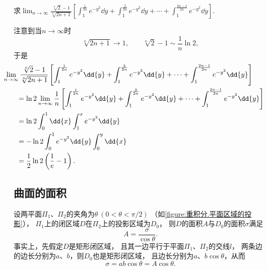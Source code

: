 \begin{example}
求\(\lim_{n\to\infty} \frac{\sqrt[n]{2}-1}{\sqrt[n]{2n+1}}
\left[
	\int_1^{\frac1{2n}} e^{-y^2} \dd{y}
	+ \int_1^{\frac3{2n}} e^{-y^2} \dd{y}
	+ \dotsb + \int_1^{\frac{2n-1}{2n}} e^{-y^2} \dd{y}
\right]\).
\begin{solution}
注意到当\(n\to\infty\)时\begin{equation*}
	\sqrt[n]{2n+1} \to 1,%
	\qquad
	\sqrt[n]{2}-1 \sim \frac1n \ln2,%
\end{equation*}
于是\begin{align*}
	&\hspace{-20pt}
	\lim_{n\to\infty} \frac{\sqrt[n]{2}-1}{\sqrt[n]{2n+1}}
	\left[
		\int_1^{\frac1{2n}} e^{-y^2} \dd{y}
		+ \int_1^{\frac3{2n}} e^{-y^2} \dd{y}
		+ \dotsb + \int_1^{\frac{2n-1}{2n}} e^{-y^2} \dd{y}
	\right] \\
	&= \ln2 \lim_{n\to\infty} \frac1n
	\left[
		\int_1^{\frac1{2n}} e^{-y^2} \dd{y}
		+ \int_1^{\frac3{2n}} e^{-y^2} \dd{y}
		+ \dotsb + \int_1^{\frac{2n-1}{2n}} e^{-y^2} \dd{y}
	\right] \\
	&= \ln2 \int_0^1 \dd{x} \int_1^x e^{-y^2} \dd{y} \\
	&= -\ln 2 \int_0^1 e^{-y^2} \dd{y} \int_0^y \dd{x} \\
	&= \frac12 \ln2 \left( \frac1e - 1 \right).
\end{align*}
\end{solution}
\end{example}

\subsection{曲面的面积}
设两平面\(\Pi_1\)、\(\Pi_2\)的夹角为\(\theta\ (0<\theta<\pi/2)\)
（如\cref{figure:重积分.平面区域的投影}），
\(\Pi_1\)上的闭区域\(D\)在\(\Pi_2\)上的投影区域为\(D_0\)，
则\(D\)的面积\(A\)与\(D_0\)的面积\(\sigma\)满足\begin{equation*}
	A = \frac{\sigma}{\cos\theta}.
\end{equation*}
事实上，先假定\(D\)是矩形闭区域，
且其一边平行于平面\(\Pi_1\)、\(\Pi_2\)的交线\(l\)，
两条边的边长分别为\(a\)、\(b\)，则\(D_0\)也是矩形闭区域，
且边长分别为\(a\)、\(b \cos\theta\)，从而\begin{equation*}
	\sigma = ab\cos\theta = A \cos\theta.
\end{equation*}

